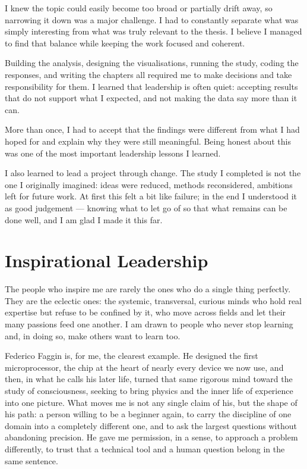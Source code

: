 I knew the topic could easily become too broad or partially drift away, so narrowing it down was a major challenge. I had to constantly separate what was simply interesting from what was truly relevant to the thesis. I believe I managed to find that balance while keeping the work focused and coherent.

Building the analysis, designing the visualisations, running the study, coding the responses, and writing the chapters all required me to make decisions and take responsibility for them. I learned that leadership is often quiet: accepting results that do not support what I expected, and not making the data say more than it can.

More than once, I had to accept that the findings were different from what I had hoped for and explain why they were still meaningful. Being honest about this was one of the most important leadership lessons I learned.

I also learned to lead a project through change. The study I completed is not the one I originally imagined: ideas were reduced, methods reconsidered, ambitions left for future work. At first this felt a bit like failure; in the end I understood it as good judgement --- knowing what to let go of so that what remains can be done well, and I am glad I made it this far.


\section{Inspirational Leadership}
\label{sec:inspiration}

The people who inspire me are rarely the ones who do a single thing perfectly. They are the eclectic ones: the systemic, transversal, curious minds who hold real expertise but refuse to be confined by it, who move across fields and let their many passions feed one another. I am drawn to people who never stop learning and, in doing so, make others want to learn too.

Federico Faggin is, for me, the clearest example. He designed the first microprocessor, the chip at the heart of nearly every device we now use, and then, in what he calls his later life, turned that same rigorous mind toward the study of consciousness, seeking to bring physics and the inner life of experience into one picture. What moves me is not any single claim of his, but the shape of his path: a person willing to be a beginner again, to carry the discipline of one domain into a completely different one, and to ask the largest questions without abandoning precision. He gave me permission, in a sense, to approach a problem differently, to trust that a technical tool and a human question belong in the same sentence.

